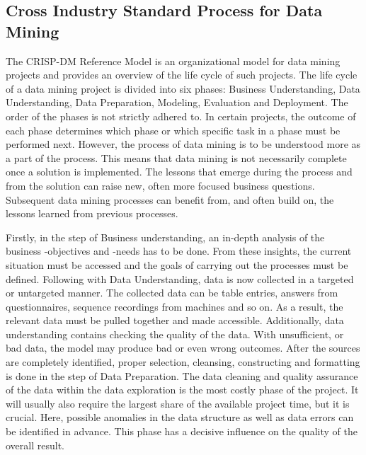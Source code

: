 \subsection{Cross Industry Standard Process for Data Mining}

The CRISP-DM Reference Model is an organizational model for data mining projects and provides
an overview of the life cycle of such projects.  
The life cycle of a data mining project is divided into six phases: Business Understanding,
Data Understanding, Data Preparation, Modeling, Evaluation and Deployment. 
The order of the phases is not strictly adhered to. In certain projects,
the outcome of each phase determines which phase or which specific task in a phase must be performed next. \cite[p. 528]{Schroer2021}
However, the process of data mining is to be understood more as a part of the process.
This means that data mining is not necessarily complete once a solution is implemented. 
The lessons that emerge during the process and from the solution can raise new,
often more focused business questions. 
Subsequent data mining processes can benefit from, and often build on,
the lessons learned from previous processes. \cite[p. 529]{Schroer2021}

Firstly, in the step of Business understanding, an in-depth analysis of the business -objectives and -needs has to be done. 
From these insights, the current situation must be accessed and the goals of carrying out the processes must be defined. \cite[]{Lopez2021}
Following with Data Understanding, data is now collected in a targeted or untargeted manner. 
The collected data can be table entries, answers from questionnaires, sequence recordings from machines and so on. 
As a result, the relevant data must be pulled together and made accessible. Additionally, data understanding contains checking the quality of the data.
With unsufficient, or bad data, the model may produce bad or even wrong outcomes. \cite[]{Miner2017}
After the sources are completely identified, proper selection, cleansing, constructing and formatting is done in the step of Data Preparation. 
The data cleaning and quality assurance of the data within the data exploration is the most costly phase of the project. 
It will usually also require the largest share of the available project time, but it is crucial. Here, possible anomalies in the data structure as well as data errors can be identified in advance. 
This phase has a decisive influence on the quality of the overall result. \cite[]{Miner2017}

